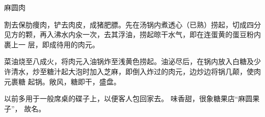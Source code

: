 \begin{recipe}{麻圆肉}

\ingredients


\preparation

\step 割去保肋痩肉，铲去肉皮，成猪肥膘。先在汤锅内煮透心（已熟）捞起，切成四分
见方的颗，再入沸水内汆一次，去其浮油，捞起晾干水气，即在连蛋黄的蛋豆粉内裹上一
层，即成待用的肉元。

\step 菜油烧至八成火，将肉元入油锅炸至浅黄色捞起。油泌尽后，在锅内放入白糖及少
许清水，炒至糖汁起大泡时加入芝麻，即倒入炸过的肉元，边炒边将锅几颠，使肉元裹糖
起锅。敞风，糖即干，盛盘。

\features

以前多用于一般席桌的碟子上，以便客人包回家去。 味香甜，很象糖果店“麻圆果子”，
故名。

\end{recipe}


